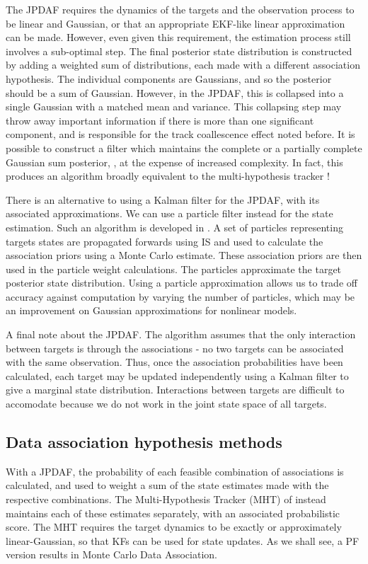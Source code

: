 The JPDAF requires the dynamics of the targets and the observation process to be linear and Gaussian, or that an appropriate EKF-like linear approximation can be made. However, even given this requirement, the estimation process still involves a sub-optimal step. The final posterior state distribution is constructed by adding a weighted sum of distributions, each made with a different association hypothesis. The individual components are Gaussians, and so the posterior should be a sum of Gaussian. However, in the JPDAF, this is collapsed into a single Gaussian with a matched mean and variance. This collapsing step may throw away important information if there is more than one significant component, and is responsible for the track coallescence effect noted before. It is possible to construct a filter which maintains the complete or a partially complete Gaussian sum posterior, \cite{Singer1974,Salmond1990}, at the expense of increased complexity. In fact, this produces an algorithm broadly equivalent to the multi-hypothesis tracker \cite{Blackman2004}!

There is an alternative to using a Kalman filter for the JPDAF, with its associated approximations. We can use a particle filter instead for the state estimation. Such an algorithm is developed in \cite{Vermaak2005}. A set of particles representing targets states are propagated forwards using IS and used to calculate the association priors using a Monte Carlo estimate. These association priors are then used in the particle weight calculations. The particles approximate the target posterior state distribution. Using a particle approximation allows us to trade off accuracy against computation by varying the number of particles, which may be an improvement on Gaussian approximations for nonlinear models.

A final note about the JPDAF. The algorithm assumes that the only interaction between targets is through the associations - no two targets can be associated with the same observation. Thus, once the association probabilities have been calculated, each target may be updated independently using a Kalman filter to give a marginal state distribution. Interactions between targets are difficult to accomodate because we do not work in the joint state space of all targets.



\subsection{Data association hypothesis methods}
With a JPDAF, the probability of each feasible combination of associations is calculated, and used to weight a sum of the state estimates made with the respective combinations. The Multi-Hypothesis Tracker (MHT) of \cite{Reid1979} instead maintains each of these estimates separately, with an associated probabilistic score. The MHT requires the target dynamics to be exactly or approximately linear-Gaussian, so that KFs can be used for state updates. As we shall see, a PF version results in Monte Carlo Data Association.

